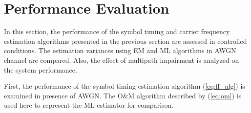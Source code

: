 \documentclass[12pt, draftclsnofoot, onecolumn]{IEEEtran}
\begin{document}



\section{Performance Evaluation}
\label{sec:perfo}
In this section, the performance of the symbol timing and carrier frequency estimation algorithms presented in the previous section are assessed in controlled conditions.
The estimation variances using EM and ML algorithms in AWGN channel are compared.
Also, the effect of multipath impairment is analyzed on the system performance.


First, the performance of the symbol timing estimation algorithm (\ref{eq:ff_alg}) is examined in presence of AWGN.
The O\&M algorithm
described by (\ref{eq:om})
is used here to represent the ML estimator for comparison.
\end{document}

